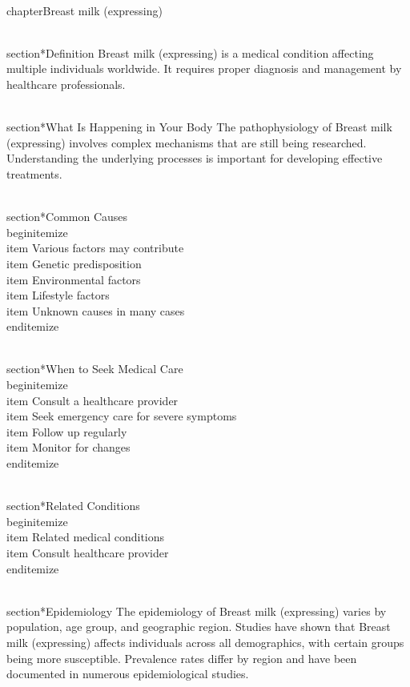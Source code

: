 
\\chapter{Breast milk (expressing)}

\\section*{Definition}
Breast milk (expressing) is a medical condition affecting multiple individuals worldwide. It requires proper diagnosis and management by healthcare professionals.

\\section*{What Is Happening in Your Body}
The pathophysiology of Breast milk (expressing) involves complex mechanisms that are still being researched. Understanding the underlying processes is important for developing effective treatments.

\\section*{Common Causes}
\\begin{itemize}
\\item Various factors may contribute\n  \\item Genetic predisposition\n  \\item Environmental factors\n  \\item Lifestyle factors\n  \\item Unknown causes in many cases
\\end{itemize}

\\section*{When to Seek Medical Care}
\\begin{itemize}
\\item Consult a healthcare provider\n  \\item Seek emergency care for severe symptoms\n  \\item Follow up regularly\n  \\item Monitor for changes
\\end{itemize}

\\section*{Related Conditions}
\\begin{itemize}
\\item Related medical conditions\n  \\item Consult healthcare provider
\\end{itemize}

\\section*{Epidemiology}
The epidemiology of Breast milk (expressing) varies by population, age group, and geographic region. Studies have shown that Breast milk (expressing) affects individuals across all demographics, with certain groups being more susceptible. Prevalence rates differ by region and have been documented in numerous epidemiological studies.

